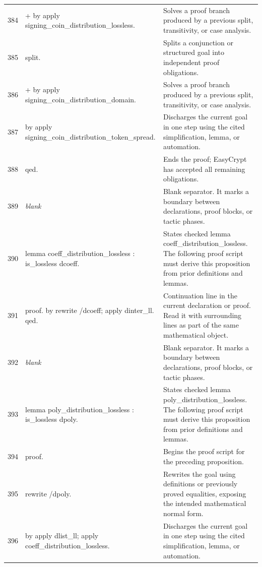 \documentclass[10pt]{article}
\begin{document}
\begin{longtable}{r L{0.53\textwidth} L{0.37\textwidth}}
384 & {\ttfamily\scriptsize + by apply signing\_coin\_distribution\_lossless.} & Solves a proof branch produced by a previous split, transitivity, or case analysis. \\
385 & {\ttfamily\scriptsize split.} & Splits a conjunction or structured goal into independent proof obligations. \\
386 & {\ttfamily\scriptsize + by apply signing\_coin\_distribution\_domain.} & Solves a proof branch produced by a previous split, transitivity, or case analysis. \\
387 & {\ttfamily\scriptsize by apply signing\_coin\_distribution\_token\_spread.} & Discharges the current goal in one step using the cited simplification, lemma, or automation. \\
388 & {\ttfamily\scriptsize qed.} & Ends the proof; EasyCrypt has accepted all remaining obligations. \\
389 & {\ttfamily\scriptsize \emph{blank}} & Blank separator.  It marks a boundary between declarations, proof blocks, or tactic phases. \\
390 & {\ttfamily\scriptsize lemma coeff\_distribution\_lossless : is\_lossless dcoeff.} & States checked lemma coeff\_distribution\_lossless.  The following proof script must derive this proposition from prior definitions and lemmas. \\
391 & {\ttfamily\scriptsize proof. by rewrite /dcoeff; apply dinter\_ll. qed.} & Continuation line in the current declaration or proof.  Read it with surrounding lines as part of the same mathematical object. \\
392 & {\ttfamily\scriptsize \emph{blank}} & Blank separator.  It marks a boundary between declarations, proof blocks, or tactic phases. \\
393 & {\ttfamily\scriptsize lemma poly\_distribution\_lossless : is\_lossless dpoly.} & States checked lemma poly\_distribution\_lossless.  The following proof script must derive this proposition from prior definitions and lemmas. \\
394 & {\ttfamily\scriptsize proof.} & Begins the proof script for the preceding proposition. \\
395 & {\ttfamily\scriptsize rewrite /dpoly.} & Rewrites the goal using definitions or previously proved equalities, exposing the intended mathematical normal form. \\
396 & {\ttfamily\scriptsize by apply dlist\_ll; apply coeff\_distribution\_lossless.} & Discharges the current goal in one step using the cited simplification, lemma, or automation. \\

\end{longtable}
\end{document}

